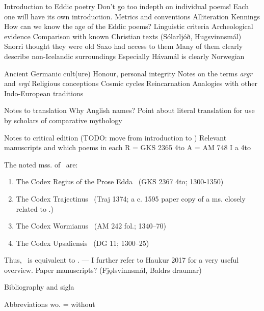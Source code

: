 Introduction to Eddic poetry
  Don't go too indepth on individual poems! Each one will have its own introduction.
  Metrics and conventions
    Alliteration
    Kennings
  How can we know the age of the Eddic poems?
    Linguistic criteria
    Archeological evidence
    Comparison with known Christian texts (Sólarljóð, Hugsvinnsmál)
    Snorri thought they were old
    Saxo had access to them
    Many of them clearly describe non-Icelandic surroundings
      Especially Hávamál is clearly Norwegian

Ancient Germanic cult(ure)
  Honour, personal integrity
  Notes on the terms \emph{argr} and \emph{ergi}
  Religious conceptions
    Cosmic cycles
    Reincarnation
    Analogies with other Indo-European traditions

Notes to translation
  Why Anglish names?
  Point about literal translation for use by scholars of comparative mythology

Notes to critical edition (TODO: move from introduction to \Voluspa)
  Relevant manuscripts and which poems in each
    R = GKS 2365 4to
    A = AM 748 I a 4to
    
    The noted mss. of \Gylfaginning\ are:\begin{enumerate} %
	\item The Codex Regius of the Prose Edda \RegiusProse\ (GKS 2367 4to; 1300-1350)
	\item The Codex Trajectinus \Trajectinus\ (Traj 1374; a c. 1595 paper copy of a ms. closely related to \RegiusProse.)
	\item The Codex Wormianus \Wormianus\ (AM 242 fol.; 1340–70)
	\item The Codex Upsaliensis \Upsaliensis\ (DG 11; 1300–25)
\end{enumerate}

Thus, \GylfMS\ is equivalent to \RegiusProse\Trajectinus\Wormianus\Upsaliensis. — I further refer to Haukur 2017 for a very useful overview.
    Paper manuscripts? (Fjǫlsvinnsmál, Baldrs draumar)
  
Bibliography and sigla
  
Abbreviations
  wo. = without
